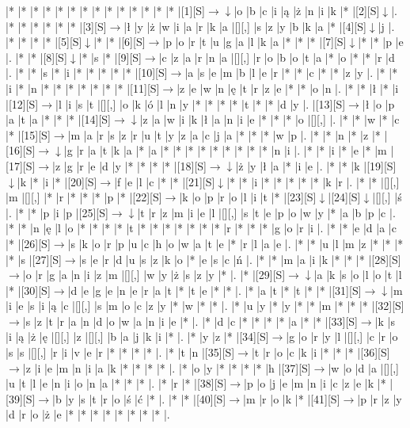 \documentclass[11pt]{article}
\newcommand\drarr{$\rightarrow \!\!\!\!\! \downarrow$}
\newcommand\rarr{$\rightarrow$}
\newcommand\darr{$\downarrow$}
\begin{document}
\noindent\begin{Puzzle}{25}{26}|*	|*	|*	|*	|*	|*	|*	|*	|*	|*	|*	|*	|*	|*	|[1][S]\drarr	|o	|b	|c	|i	|ą	|ż	|n	|i	|k	|*	|[2][S]\darr	|.
|*	|*	|*	|*	|*	|*	|[3][S]\rarr	|ł	|y	|ż	|w	|i	|a	|r	|k	|a	|[][,]{ }	|s	|z	|y	|b	|k	|a	|*	|[4][S]\darr	|j	|.
|*	|*	|*	|*	|[5][S]\darr	|*	|*	|[6][S]\rarr	|p	|o	|r	|t	|u	|g	|a	|l	|k	|a	|*	|*	|*	|[7][S]\darr	|*	|*	|p	|e	|.
|*	|*	|[8][S]\darr	|*	|s	|*	|[9][S]\rarr	|c	|z	|a	|r	|n	|a	|[][,]{ }	|r	|o	|b	|o	|t	|a	|*	|o	|*	|*	|r	|d	|.
|*	|*	|s	|*	|i	|*	|*	|*	|*	|*	|[10][S]\rarr	|a	|s	|e	|m	|b	|l	|e	|r	|*	|*	|c	|*	|*	|z	|y	|.
|*	|*	|i	|*	|n	|*	|*	|*	|*	|*	|*	|*	|[11][S]\rarr	|z	|e	|w	|n	|ę	|t	|r	|z	|e	|*	|*	|o	|n	|.
|*	|*	|ł	|*	|i	|[12][S]\rarr	|l	|i	|s	|t	|[][,]{ }	|o	|k	|ó	|l	|n	|y	|*	|*	|*	|*	|t	|*	|*	|d	|y	|.
|[13][S]\rarr	|ł	|o	|p	|a	|t	|a	|*	|*	|*	|[14][S]\drarr	|z	|a	|w	|i	|k	|ł	|a	|n	|i	|e	|*	|*	|*	|o	|[][,]{ }	|.
|*	|*	|w	|*	|c	|*	|[15][S]\rarr	|m	|a	|r	|s	|z	|r	|u	|t	|y	|z	|a	|c	|j	|a	|*	|*	|*	|w	|p	|.
|*	|*	|n	|*	|z	|*	|[16][S]\drarr	|g	|r	|a	|t	|k	|a	|*	|a	|*	|*	|*	|*	|*	|*	|*	|*	|*	|n	|i	|.
|*	|*	|i	|*	|e	|*	|m	|[17][S]\rarr	|z	|g	|r	|e	|d	|y	|*	|*	|*	|*	|[18][S]\drarr	|ż	|y	|ł	|a	|*	|i	|e	|.
|*	|*	|k	|[19][S]\darr	|k	|*	|i	|*	|[20][S]\rarr	|f	|e	|l	|c	|*	|*	|[21][S]\darr	|*	|*	|i	|*	|*	|*	|*	|*	|k	|r	|.
|*	|*	|[][,]{ }	|m	|[][,]{ }	|*	|r	|*	|*	|*	|p	|*	|[22][S]\rarr	|k	|o	|p	|r	|o	|l	|i	|t	|*	|[23][S]\darr	|[24][S]\darr	|[][,]{ }	|ś	|.
|*	|*	|p	|i	|p	|[25][S]\drarr	|t	|r	|z	|m	|i	|e	|l	|[][,]{ }	|s	|t	|e	|p	|o	|w	|y	|*	|a	|b	|p	|c	|.
|*	|*	|n	|ę	|l	|o	|*	|*	|*	|*	|t	|*	|*	|*	|*	|*	|*	|*	|r	|*	|*	|*	|g	|o	|r	|i	|.
|*	|*	|e	|d	|a	|c	|*	|[26][S]\rarr	|s	|k	|o	|r	|p	|u	|c	|h	|o	|w	|a	|t	|e	|*	|r	|l	|a	|e	|.
|*	|*	|u	|l	|m	|z	|*	|*	|*	|*	|s	|[27][S]\rarr	|s	|e	|r	|d	|u	|s	|z	|k	|o	|*	|e	|s	|c	|ń	|.
|*	|*	|m	|a	|i	|k	|*	|*	|*	|[28][S]\rarr	|o	|r	|g	|a	|n	|i	|z	|m	|[][,]{ }	|w	|y	|ż	|s	|z	|y	|*	|.
|*	|[29][S]\drarr	|a	|k	|s	|o	|l	|o	|t	|l	|*	|[30][S]\rarr	|d	|e	|g	|e	|n	|e	|r	|a	|t	|*	|t	|e	|*	|*	|.
|*	|a	|t	|*	|t	|*	|*	|[31][S]\drarr	|m	|i	|e	|s	|i	|ą	|c	|[][,]{ }	|s	|m	|o	|c	|z	|y	|*	|w	|*	|*	|.
|*	|u	|y	|*	|y	|*	|*	|m	|*	|*	|*	|[32][S]\rarr	|s	|z	|t	|r	|a	|n	|d	|o	|w	|a	|n	|i	|e	|*	|.
|*	|d	|c	|*	|*	|*	|*	|a	|*	|*	|[33][S]\rarr	|k	|s	|i	|ą	|ż	|ę	|[][,]{ }	|z	|[][,]{ }	|b	|a	|j	|k	|i	|*	|.
|*	|y	|z	|*	|[34][S]\rarr	|g	|o	|r	|y	|l	|[][,]{ }	|c	|r	|o	|s	|s	|[][,]{ }	|r	|i	|v	|e	|r	|*	|*	|*	|*	|.
|*	|t	|n	|[35][S]\rarr	|t	|r	|o	|c	|k	|i	|*	|*	|*	|[36][S]\rarr	|z	|i	|e	|m	|n	|i	|a	|k	|*	|*	|*	|*	|.
|*	|o	|y	|*	|*	|*	|*	|h	|[37][S]\rarr	|w	|o	|d	|a	|[][,]{ }	|u	|t	|l	|e	|n	|i	|o	|n	|a	|*	|*	|*	|.
|*	|r	|*	|[38][S]\rarr	|p	|o	|j	|e	|m	|n	|i	|c	|z	|e	|k	|*	|[39][S]\rarr	|b	|y	|s	|t	|r	|o	|ś	|ć	|*	|.
|*	|*	|[40][S]\rarr	|m	|r	|o	|k	|*	|[41][S]\rarr	|p	|r	|z	|y	|d	|r	|o	|ż	|e	|*	|*	|*	|*	|*	|*	|*	|*	|.\end{Puzzle}
\end{document}
